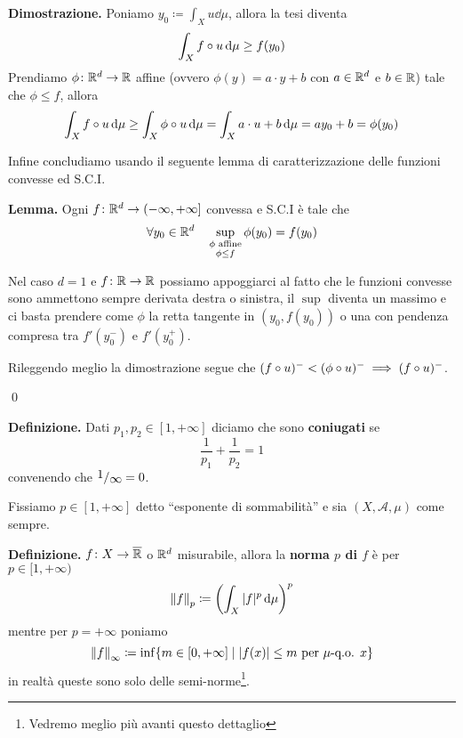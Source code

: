 \documentclass[a4paper, 12pt]{report}
\begin{document}
\textbf{Dimostrazione.}
Poniamo $y_0 \coloneqq \int_X u \dd \mu$, allora la tesi diventa
$$
\int_X f \circ u \,\mathrm{d} \mu \geq f(y_0)
$$
Prendiamo $\phi \colon \mathbb R^d \to \mathbb R$ affine (ovvero $\phi(y) = a \cdot y + b$ con $a \in \mathbb R^d$ e $b \in \mathbb R$) tale che $\phi \leq f$, allora
$$
\int_X f \circ u \,\mathrm{d} \mu \geq \int_X \phi \circ u \,\mathrm{d} \mu = \int_X a \cdot u + b \,\mathrm{d} \mu = a y_0 + b = \phi(y_0)
$$

Infine concludiamo usando il seguente lemma di caratterizzazione delle funzioni convesse ed S.C.I.

\textbf{Lemma.}
Ogni $f \colon \mathbb R^d \to (-\infty, +\infty]$ convessa e S.C.I è tale che
$$
\forall y_0 \in \mathbb R^d \quad \sup_{\substack{\phi \text{ affine} \\ \phi \leq f}} \phi(y_0) = f(y_0)
$$

Nel caso $d = 1$ e $f \colon \mathbb R \to \mathbb R$ possiamo appoggiarci al fatto che le funzioni convesse sono ammettono sempre derivata destra o sinistra, il $\sup$ diventa un massimo e ci basta prendere come $\phi$ la retta tangente in $(y_0, f(y_0))$ o una con pendenza compresa tra $f'(y_0^-)$ e $f'(y_0^+)$.

Rileggendo meglio la dimostrazione segue che $(f \circ u)^- < (\phi \circ u)^- \implies (f \circ u)^-$. 

\qed

\textbf{Definizione.} Dati $p_1, p_2 \in [1, +\infty]$ diciamo che sono \textbf{coniugati} se
$$
\frac{1}{p_1} + \frac{1}{p_2} = 1
$$
convenendo che $\sfrac{1}{\infty} = 0$.

Fissiamo $p \in [1, +\infty]$ detto ``esponente di sommabilità'' e sia $(X, \mathcal A, \mu)$ come sempre.

\textbf{Definizione.} $f \colon X \to \overline {\mathbb R}$ o $\mathbb R^d$ misurabile, allora la \textbf{norma $p$ di $f$} è per $p \in [1, +\infty)$
$$
\left\lVert f \right\rVert_p \coloneqq \left( \int_X |f|^p \,\mathrm{d} \mu \right)^p
$$
mentre per $p = +\infty$ poniamo
$$
\left\lVert f \right\rVert_\infty \coloneqq \inf \{ m \in [0, +\infty] \mid |f(x)| \leq m \text{ per $\mu$-q.o. } x \}
$$
in realtà queste sono solo delle semi-norme\footnote{Vedremo meglio più avanti questo dettaglio}.
\end{document}
